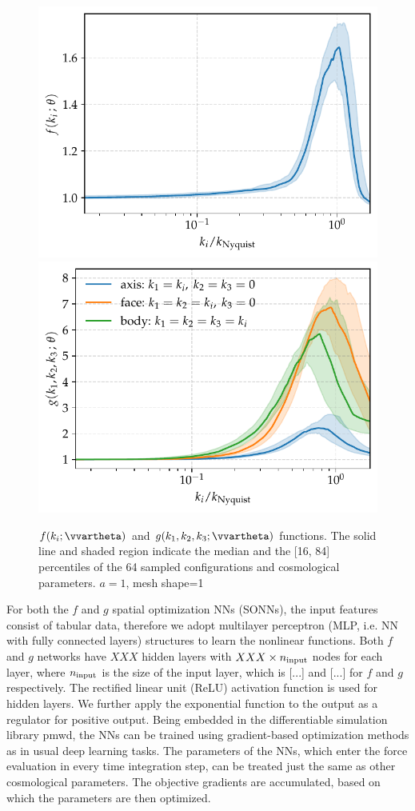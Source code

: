 \documentclass[modern, trackchanges, dvipsnames]{aastex631}
\newcommand{\pmwd}{{\usefont{T1}{nova}{m}{sl}pmwd}}
\begin{document}
\begin{figure}
  \centering
  \includegraphics[width=.48\columnwidth]{net_f_a1_j3177874_e3000.pdf}
  \includegraphics[width=.48\columnwidth]{net_g_a1_j3177874_e3000.pdf}
  \caption{$f(k_i; \vvartheta)$ and $g(k_1, k_2, k_3; \vvartheta)$
  functions. The solid line and shaded region indicate the median and
  the [16, 84] percentiles of the 64 sampled configurations and
  cosmological parameters. $a=1$,
  mesh shape=1}
  \label{fig:func}
\end{figure}

For both the $f$ and $g$ spatial optimization NNs (SONNs), the input
features consist of tabular data, therefore we adopt multilayer
perceptron (MLP, i.e. NN with fully connected layers) structures to
learn the nonlinear functions.
Both $f$ and $g$ networks have $XXX$ hidden layers with $XXX\times n_{\rm
input}$ nodes for each layer, where $n_{\rm input}$ is the size of the
input layer, which is [...] and [...] for $f$ and $g$ respectively.
The rectified linear unit (ReLU) activation function is used for hidden
layers.
We further apply the exponential function to the output as a regulator
for positive output.
Being embedded in the differentiable simulation library \pmwd, the NNs
can be trained using gradient-based optimization methods as in usual
deep learning tasks.
The parameters of the NNs, which enter the force evaluation in every
time integration step, can be treated just the same as other
cosmological parameters.
The objective gradients are accumulated, based on which the parameters
are then optimized.
\end{document}
